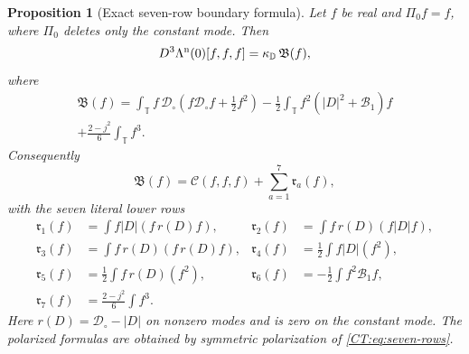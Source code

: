\documentclass[11pt]{amsart}
\numberwithin{equation}{section}
\newtheorem{proposition}[theorem]{Proposition}
\theoremstyle{definition}
\theoremstyle{remark}
\newcommand{\T}{\mathbb T}
\newcommand{\PiZero}{\Pi_0}
\newcommand{\Dop}{|D|}
\newcommand{\Cnull}{\mathcal C}
\begin{document}
\begin{proposition}[Exact seven-row boundary formula]
\label{CT:prop:seven-row}
Let $f$ be real and $\PiZero f=f$, where $\PiZero$ deletes only the
constant mode.  Then
\begin{equation}\label{CT:eq:exact-boundary-cubic}
 D^3\Lambda^{\rm n}(0)[f,f,f]
 =\kappa_{\mathbb D}\,\mathfrak B(f),
\end{equation}
where
\begin{multline}\label{CT:eq:B-exact}
 \mathfrak B(f)
 =\int_\T f\,\mathcal D_\circ
       \left(f\mathcal D_\circ f+\frac12f^2\right)
 -\frac12\int_\T f^2(\Dop^2+\mathcal B_1)f\\
 +\frac{2-j^2}{6}\int_\T f^3.
\end{multline}
Consequently
\begin{equation}\label{CT:eq:seven-row}
 \mathfrak B(f)=\Cnull(f,f,f)+\sum_{a=1}^7\mathfrak r_a(f),
\end{equation}
with the seven literal lower rows
\begin{align}
 \mathfrak r_1(f)&=\int f\Dop(f\,r(D)f),
 &\mathfrak r_2(f)&=\int f\,r(D)(f\Dop f),\\
 \mathfrak r_3(f)&=\int f\,r(D)(f\,r(D)f),
 &\mathfrak r_4(f)&=\frac12\int f\Dop(f^2),\\
 \mathfrak r_5(f)&=\frac12\int f\,r(D)(f^2),
 &\mathfrak r_6(f)&=-\frac12\int f^2\mathcal B_1f,
 \label{CT:eq:seven-rows}\\
 \mathfrak r_7(f)&=\frac{2-j^2}{6}\int f^3.&&
\end{align}
Here $r(D)=\mathcal D_\circ-\Dop$ on nonzero modes and is zero on the
constant mode.  The polarized formulas are obtained by symmetric
polarization of \eqref{CT:eq:seven-rows}.
\end{proposition}
\end{document}
